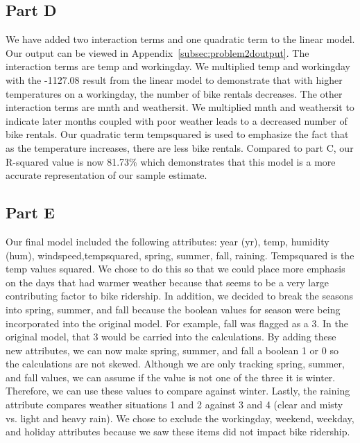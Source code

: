 \documentclass[11pt]{article}
\begin{document}
\subsection{Part D}
\label{subsec:2d}
We have added two interaction terms and one quadratic term to the linear model. Our output can be viewed in Appendix~\ref{subsec:problem2doutput}. The interaction terms are temp and workingday. We multiplied temp and workingday with the -1127.08 result from the linear model to demonstrate that with higher temperatures on a workingday, the number of bike rentals decreases. The other interaction terms are  mnth and weathersit. We multiplied mnth and weathersit to indicate later months coupled with poor weather leads to a decreased number of bike rentals. Our quadratic term tempsquared is used to emphasize the fact that as the temperature increases, there are less bike rentals.  
Compared to part C, our R-squared value is now 81.73\% which demonstrates that this model is a more accurate representation of our sample estimate. 
\subsection{Part E}
\label{subsec:2e}

Our final model included the following attributes: year (yr), temp, humidity (hum), windspeed,tempsquared, spring, summer, fall, raining. Tempsquared is the temp values squared. We chose to do this so that we could place more emphasis on the days that had warmer weather because that seems to be a very large contributing factor to bike ridership. In addition, we decided to break the seasons into spring, summer, and fall because the boolean values for season were being incorporated into the original model. For example, fall was flagged as a 3. In  the original model, that 3 would be carried into the calculations. By adding these new attributes, we can now make spring, summer, and fall a boolean 1 or 0 so the calculations are not skewed. Although we are only tracking spring, summer, and fall values, we can assume if the value is not one of the three it is winter. Therefore, we can use these values to compare against winter. Lastly, the raining attribute compares weather situations 1 and 2 against 3 and 4 (clear and misty vs. light and heavy rain). We chose to exclude the workingday, weekend, weekday, and holiday attributes because we saw these items did not impact bike ridership.
\end{document}
